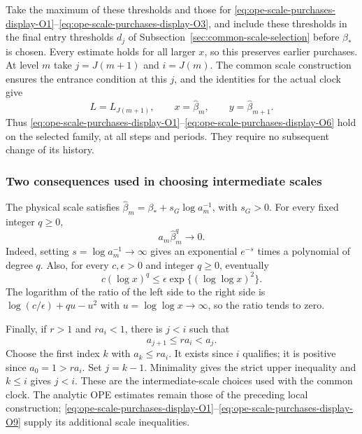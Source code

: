 Take the maximum of these thresholds and those for \eqref{eq:ope-scale-purchases-display-O1}--\eqref{eq:ope-scale-purchases-display-O3},
and include these thresholds in the final entry thresholds $d_j$ of
Subsection~\ref{sec:common-scale-selection} before $\beta_*$ is chosen.
Every estimate holds for all larger $x$, so this preserves earlier
purchases. At level $m$ take $j=J(m+1)$ and $i=J(m)$. The
common scale construction ensures the entrance condition at this
$j$, and the identities for the actual clock give
\[
 L=L_{J(m+1)},\qquad x=\widehat\beta_m,\qquad
 y=\widehat\beta_{m+1}.
\]
Thus \eqref{eq:ope-scale-purchases-display-O1}--\eqref{eq:ope-scale-purchases-display-O6} hold on the selected family, at all steps and
periods. They require no subsequent change of its history.

\subsubsection{Two consequences used in choosing intermediate scales}
The physical scale satisfies
$\widehat\beta_m=\beta_*+s_G\log a_m^{-1}$, with $s_G>0$.
For every fixed integer $q\ge0$,
\begin{equation}
                 a_m\widehat\beta_m^q\longrightarrow0.
 \label{eq:ope-scale-purchases-display-O7}
\end{equation}
Indeed, setting $s=\log a_m^{-1}\to\infty$ gives an exponential
$e^{-s}$ times a polynomial of degree $q$. Also, for every
$c,\epsilon>0$ and integer $q\ge0$, eventually
\begin{equation}
 c(\log x)^q\le\epsilon\exp\{(\log\log x)^2\}.
 \label{eq:ope-scale-purchases-display-O8}
\end{equation}
The logarithm of the ratio of the left side to the right side is
$\log(c/\epsilon)+qu-u^2$ with $u=\log\log x\to\infty$,
so the ratio tends to zero.

Finally, if $r>1$ and $ra_i<1$, there is $j<i$ such that
\begin{equation}
                         a_{j+1}\le ra_i<a_j.
 \label{eq:ope-scale-purchases-display-O9}
\end{equation}
Choose the first index $k$ with $a_k\le ra_i$. It exists since
$i$ qualifies; it is positive since $a_0=1>ra_i$.
Set $j=k-1$. Minimality gives the strict upper inequality and
$k\le i$ gives $j<i$. These are the intermediate-scale choices
used with the common clock. The analytic OPE estimates remain
those of the preceding local construction; \eqref{eq:ope-scale-purchases-display-O1}--\eqref{eq:ope-scale-purchases-display-O9} supply
its additional scale inequalities.
